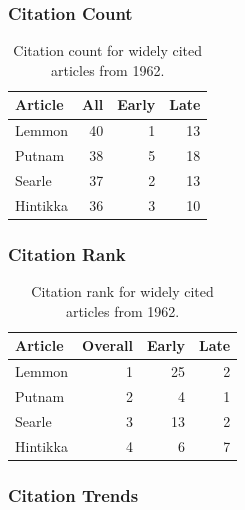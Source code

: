 \documentclass[
  10pt,
  letterpaper,
  DIV=11,
  numbers=noendperiod,
  twoside]{scrartcl}
\begin{document}
\subsubsection*{Citation Count}\label{sec-count-1962}

\begin{longtable}[]{@{}lrrr@{}}

\caption{\label{tbl-citation-count-1962}Citation count for widely cited
articles from 1962.}

\tabularnewline

\toprule\noalign{}
Article & All & Early & Late \\
\midrule\noalign{}
\endhead
\bottomrule\noalign{}
\endlastfoot
Lemmon & 40 & 1 & 13 \\
Putnam & 38 & 5 & 18 \\
Searle & 37 & 2 & 13 \\
Hintikka & 36 & 3 & 10 \\

\end{longtable}

\subsubsection*{Citation Rank}\label{sec-rank-1962}

\begin{longtable}[]{@{}lrrr@{}}

\caption{\label{tbl-citation-rank-1962}Citation rank for widely cited
articles from 1962.}

\tabularnewline

\toprule\noalign{}
Article & Overall & Early & Late \\
\midrule\noalign{}
\endhead
\bottomrule\noalign{}
\endlastfoot
Lemmon & 1 & 25 & 2 \\
Putnam & 2 & 4 & 1 \\
Searle & 3 & 13 & 2 \\
Hintikka & 4 & 6 & 7 \\

\end{longtable}

\subsubsection*{Citation Trends}\label{sec-trends-1962}
\end{document}

